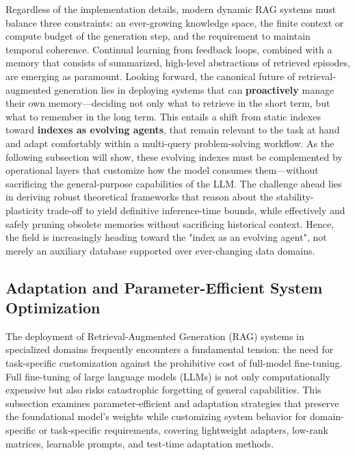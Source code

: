\documentclass[11pt,a4paper]{article}
\begin{document}
Regardless of the implementation details, modern dynamic RAG systems must balance three constraints: an ever-growing knowledge space, the finite context or compute budget of the generation step, and the requirement to maintain temporal coherence. Continual learning from feedback loops, combined with a memory that consists of summarized, high-level abstractions of retrieved episodes, are emerging as paramount. Looking forward, the canonical future of retrieval-augmented generation lies in deploying systems that can \textbf{proactively} manage their own memory---deciding not only what to retrieve in the short term, but what to remember in the long term. This entails a shift from static indexes toward \textbf{indexes as evolving agents}, that remain relevant to the task at hand and adapt comfortably within a multi-query problem-solving workflow. As the following subsection will show, these evolving indexes must be complemented by operational layers that customize how the model consumes them---without sacrificing the general-purpose capabilities of the LLM. The challenge ahead lies in deriving robust theoretical frameworks that reason about the stability-plasticity trade-off to yield definitive inference-time bounds, while effectively and safely pruning obsolete memories without sacrificing historical context. Hence, the field is increasingly heading toward the "index as an evolving agent", not merely an auxiliary database supported over ever-changing data domains.


\subsection{Adaptation and Parameter-Efficient System Optimization}


The deployment of Retrieval-Augmented Generation (RAG) systems in specialized domains frequently encounters a fundamental tension: the need for task-specific customization against the prohibitive cost of full-model fine-tuning. Full fine-tuning of large language models (LLMs) is not only computationally expensive but also risks catastrophic forgetting of general capabilities. This subsection examines parameter-efficient and adaptation strategies that preserve the foundational model's weights while customizing system behavior for domain-specific or task-specific requirements, covering lightweight adapters, low-rank matrices, learnable prompts, and test-time adaptation methods.
\end{document}
